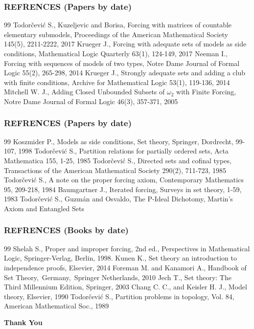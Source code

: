 \documentclass{beamer}
\begin{document}
\begin{frame}
\frametitle{REFRENCES (Papers by date)}
\begin{thebibliography}{99}
 Todorčević S., Kuzeljevic and Borisa, Forcing with matrices of countable elementary submodels, Proceedings of the American Mathematical Society 145(5), 2211-2222, 2017
 Krueger J., Forcing with adequate sets of models as side conditions, Mathematical Logic Quarterly 63(1), 124-149, 2017
 Neeman I., Forcing with sequences of models of two types, Notre Dame Journal of Formal Logic 55(2), 265-298, 2014
 Krueger J., Strongly adequate sets and adding a club with finite conditions, Archive for Mathematical Logic 53(1), 119-136, 2014
 Mitchell W. J., Adding Closed Unbounded Subsets of $\omega_2$ with Finite Forcing, Notre Dame Journal of Formal Logic 46(3), 357-371, 2005
\end{thebibliography}
\end{frame}
\begin{frame}
\frametitle{REFRENCES (Papers by date)}
\begin{thebibliography}{99}
 Koszmider P., Models as side conditions, Set theory, Springer, Dordrecht, 99-107, 1998
 Todorčević S., Partition relations for partially ordered sets, Acta Mathematica 155, 1-25, 1985
 Todorčević S., Directed sets and cofinal types, Transactions of the American Mathematical Society 290(2), 711-723, 1985
 Todorčević S., A note on the proper forcing axiom, Contemporary Mathematics 95, 209-218, 1984
 Baumgartner J., Iterated forcing, Surveys in set theory, 1-59, 1983
 Todorčević S., Guzmán and Osvaldo, The P-Ideal Dichotomy, Martin’s Axiom and Entangled Sets
\end{thebibliography}
\end{frame}
\begin{frame}
\frametitle{REFRENCES (Books by date)}
\begin{thebibliography}{99}
 Shelah S., Proper and improper forcing, 2nd ed., Perspectives in Mathematical Logic, Springer-Verlag, Berlin, 1998.
 Kunen K., Set theory an introduction to independence proofs, Elsevier, 2014
 Foreman M. and Kanamori A., Handbook of Set Theory, Germany, Springer Netherlands, 2010
 Jech T., Set theory: The Third Millennium Edition, Springer, 2003
 Chang C. C., and Keisler H. J., Model theory, Elsevier, 1990
 Todorčević S., Partition problems in topology, Vol. 84, American Mathematical Soc., 1989
\end{thebibliography}
\end{frame}
\begin{frame}
\begin{center}
\textbf{{\Huge Thank You}}
\end{center}
\end{frame}
\end{document}
